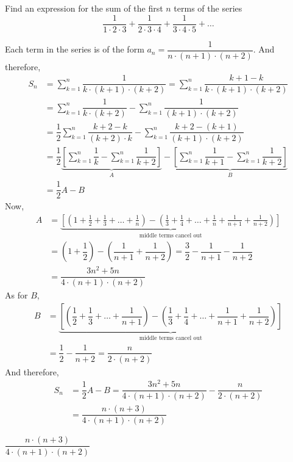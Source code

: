

\printrubric

\question[4] Find an expression for the sum of the first $n$ terms of the series 
\[ \dfrac{1}{1\cdot 2\cdot 3} + \dfrac{1}{2\cdot 3\cdot 4} + \dfrac{1}{3\cdot 4\cdot 5} + \ldots \]

\begin{solution}[\fullpage]
	Each term in the series is of the form $a_n = \dfrac{1}{n\cdot(n+1)\cdot(n+2)}$. And therefore,
	\begin{align}
		S_n &= \sum_{k=1}^{n}\dfrac{1}{k\cdot(k+1)\cdot(k+2)} 
		= \sum_{k=1}^{n}\dfrac{k+1-k}{k\cdot(k+1)\cdot(k+2)} \\
		&= \sum_{k=1}^{n}\dfrac{1}{k\cdot(k+2)} - \sum_{k=1}^{n}\dfrac{1}{(k+1)\cdot(k+2)} \\
		&= \dfrac{1}{2}\sum_{k=1}^{n}\dfrac{k+2-k}{(k+2)\cdot k} - \sum_{k=1}^{n}\dfrac{k+2-(k+1)}{(k+1)\cdot(k+2)} \\
		&= \dfrac{1}{2}\underbrace{\left[\sum_{k=1}^{n}\dfrac{1}{k} - \sum_{k=1}^{n}\dfrac{1}{k+2} \right]}_{A}
		- \underbrace{\left[ \sum_{k=1}^{n}\dfrac{1}{k+1} - \sum_{k=1}^{n}\dfrac{1}{k+2} \right]}_{B} \\
		&= \dfrac{1}{2}A - B
  \end{align}
	Now, 
	\begin{align}
		A &= \underbrace{\left[\left(1 + \frac{1}{2} + \frac{1}{3} + \ldots + \frac{1}{n} \right) 
		- \left( \frac{1}{3} + \frac{1}{4} + \ldots + \frac{1}{n} + \frac{1}{n+1} + \frac{1}{n+2}\right) 
		\right]}_{\text{middle terms cancel out}} \\
		&= \left( 1+\dfrac{1}{2}\right) - \left( \dfrac{1}{n+1} + \dfrac{1}{n+2}\right) = 
		\dfrac{3}{2}-\dfrac{1}{n+1}-\dfrac{1}{n+2} \\
		&= \dfrac{3n^2 + 5n}{4\cdot(n+1)\cdot(n+2)}
  \end{align}
	As for $B$,
	\begin{align}
		B &= \underbrace{\left[ \left(\dfrac{1}{2}+\dfrac{1}{3} + \ldots + \dfrac{1}{n+1} \right) - 
		\left( \dfrac{1}{3} + \dfrac{1}{4} + \ldots + \dfrac{1}{n+1} + \dfrac{1}{n+2} \right) \right]}
		_{\text{middle terms cancel out}} \\
		&= \dfrac{1}{2}-\dfrac{1}{n+2} = \dfrac{n}{2\cdot(n+2)}
	\end{align}
	And therefore, 
	\begin{align}
		S_n &= \dfrac{1}{2}A - B = \dfrac{3n^2 + 5n}{4\cdot(n+1)\cdot(n+2)} - \dfrac{n}{2\cdot(n+2)} \\
		&= \dfrac{n\cdot (n+3)}{4\cdot (n+1)\cdot (n+2)}
	\end{align}
\end{solution}

\ifprintanswers\begin{codex}$\dfrac{n\cdot (n+3)}{4\cdot (n+1)\cdot (n+2)}$\end{codex}\fi
